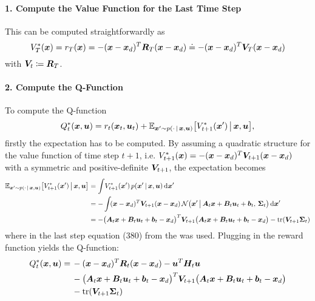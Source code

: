 				\paragraph{1. Compute the Value Function for the Last Time Step}
					This can be computed straightforwardly as
					\begin{equation*}
						V_T^\ast(\bm{x}) = r_T(\bm{x}) = -(\bm{x} - \bm{x}_d)^T \bm{R}_T (\bm{x} - \bm{x}_d) \doteq -(\bm{x} - \bm{x}_d)^T \bm{V}_T (\bm{x} - \bm{x}_d)
					\end{equation*}
					with \( \bm{V}_t \coloneqq \bm{R}_T \).

				\paragraph{2. Compute the Q-Function}
					To compute the Q-function
					\begin{equation*}
						Q_t^\ast(\bm{x}, \bm{u}) = r_t(\bm{x}_t, \bm{u}_t) + \mathbb{E}_{\bm{x}' \sim p(\cdot \,\vert\, \bm{x}, \bm{u})}\big[ V_{t + 1}^\ast(\bm{x}') \,\big\vert\, \bm{x}, \bm{u} \big],
					\end{equation*}
					firstly the expectation has to be computed. By assuming a quadratic structure for the value function of time step \(t + 1\), i.e. \( V_{t + 1}^\ast(\bm{x}) = -(\bm{x} - \bm{x}_d)^T \bm{V}_{t + 1} (\bm{x} - \bm{x}_d) \) with a symmetric and positive-definite \( \bm{V}_{t + 1} \), the expectation becomes
					\begin{align*}
						\mathbb{E}_{\bm{x}' \sim p(\cdot \,\vert\, \bm{x}, \bm{u})}\big[ V_{t + 1}^\ast(\bm{x}') \,\big\vert\, \bm{x}, \bm{u} \big]
							&= \int\! V_{t + 1}^\ast(\bm{x}') \, p(\bm{x}' \,\vert\, \bm{x}, \bm{u}) \dd{\bm{x}'} \\
							&= - \int\! (\bm{x} - \bm{x}_d)^T \bm{V}_{t + 1} (\bm{x} - \bm{x}_d) \, \mathcal{N}\big(\bm{x}' \,\big\vert\, \bm{A}_t \bm{x} + \bm{B}_t \bm{u}_t + \bm{b}_t,\, \bm{\Sigma}_t \big) \dd{\bm{x}'} \\
							&= -\big( \bm{A}_t \bm{x} + \bm{B}_t \bm{u}_t + \bm{b}_t - \bm{x}_d \big)^T \bm{V}_{t + 1} \big( \bm{A}_t \bm{x} + \bm{B}_t \bm{u}_t + \bm{b}_t - \bm{x}_d \big) - \tr(\bm{V}_{t + 1} \bm{\Sigma}_t)
					\end{align*}
					where in the last step equation (380) from the \matrixcookbook was used. Plugging in the reward function yields the Q-function:
					\begin{equation*}
						\begin{aligned}
							Q_t^\ast(\bm{x}, \bm{u}) =
								&\, -(\bm{x} - \bm{x}_d)^T \bm{R}_t (\bm{x} - \bm{x}_d) - \bm{u}^T \bm{H}_t \bm{u} \\
								&\, -\big( \bm{A}_t \bm{x} + \bm{B}_t \bm{u}_t + \bm{b}_t - \bm{x}_d \big)^T \bm{V}_{t + 1} \big( \bm{A}_t \bm{x} + \bm{B}_t \bm{u}_t + \bm{b}_t - \bm{x}_d \big) \\
								&\, -\tr(\bm{V}_{t + 1} \bm{\Sigma}_t)
						\end{aligned}  \label{eq:qFunctionLQR}
					\end{equation*}

